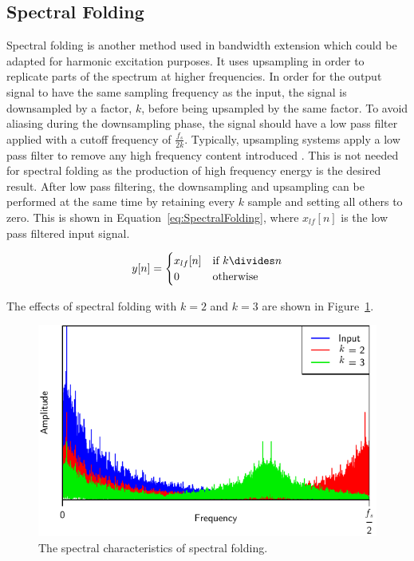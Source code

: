	\subsection{Spectral Folding}
	\label{sec:Excitation-Methods-SpectralFolding}
		Spectral folding is another method used in bandwidth extension \citep{friedrich2007spectral} which could be
		adapted for harmonic excitation purposes. It uses upsampling in order to replicate parts of the spectrum at
		higher frequencies. In order for the output signal to have the same sampling frequency as the input, the
		signal is downsampled by a factor, $k$, before being upsampled by the same factor. To avoid aliasing during
		the downsampling phase, the signal should have a low pass filter applied with a cutoff frequency of
		$\frac{f_{s}}{2k}$. Typically, upsampling systems apply a low pass filter to remove any high frequency
		content introduced \citep{oppenheim2014discrete}. This is not needed for spectral folding as the production
		of high frequency energy is the desired result. After low pass filtering, the downsampling and upsampling
		can be performed at the same time by retaining every $k$ sample and setting all others to zero.
		This is shown in Equation~\ref{eq:SpectralFolding}, where $x_{lf}[n]$ is the low pass filtered input
		signal.

		\begin{equation}
			y[n] = \begin{cases}
				x_{lf}[n] & \text{if $k \divides n$} \\
				0 & \text{otherwise}
			\end{cases}
			\label{eq:SpectralFolding}
		\end{equation}

		The effects of spectral folding with $k = 2$ and $k = 3$ are shown in Figure~\ref{fig:SpectralFolding}.

		\begin{figure}[h!]
			\centering
			\includegraphics{chapter3/Images/SpectralFoldingSpectrum.pdf}
			\caption{The spectral characteristics of spectral folding.}
			\label{fig:SpectralFolding}
		\end{figure}

